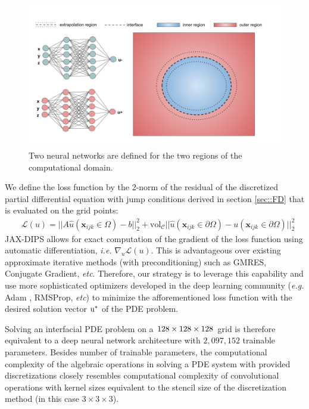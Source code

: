 \documentclass{elsarticle}
\begin{document}
\begin{figure}[ht]
	\centering
	\includegraphics[width=\linewidth]{./figures/neural_network_arch.png}
	\caption{Two neural networks are defined for the two regions of the computational domain.}
	\label{fig:shapes}
\end{figure}



We define the loss function by the 2-norm of the residual of the discretized partial differential equation with jump conditions derived in section \ref{sec::FD} that is evaluated on the grid points:
\begin{align*}
	&\mathcal{L}(u) = \vert\vert A\hat{u}(\mathbf{x}_{ijk}\in \Omega) - b\vert\vert_2^2 + \textrm{vol}_{\mathcal{C}}\vert\vert \hat{u}(\mathbf{x}_{ijk}\in\partial \Omega) - u(\mathbf{x}_{ijk}\in\partial \Omega)\vert\vert_2^2 
\end{align*}
JAX-DIPS allows for exact computation of the gradient of the loss function using automatic differentiation, \textit{i.e.} $\nabla_u \mathcal{L}(u)$. This is advantageous over existing approximate iterative methods (with preconditioning) such as GMRES, Conjugate Gradient, \textit{etc}. Therefore, our strategy is to leverage this capability and use more sophisticated optimizers developed in the deep learning community (\textit{e.g.} Adam \cite{kingma2014adam}, RMSProp, \textit{etc}) to minimize the afforementioned loss function with the desired solution vector $\rm u^\ast$ of the PDE problem.

Solving an interfacial PDE problem on a $\rm 128\times 128 \times 128$ grid is therefore equivalent to a deep neural network architecture with $2,097,152$ trainable parameters. Besides number of trainable parameters, the computational complexity of the algebraic operations in solving a PDE system with provided discretizations closely resembles computational complexity of convolutional operations with kernel sizes equivalent to the stencil size of the discretization method (in this case $3\times 3 \times 3$).
\end{document}
